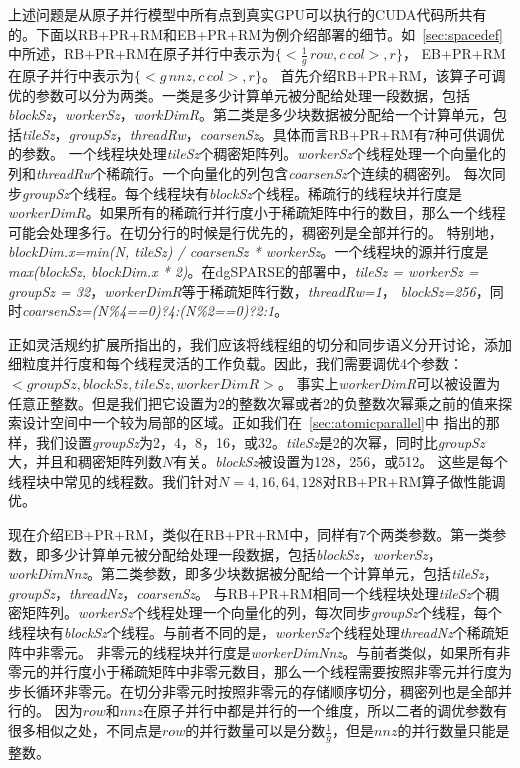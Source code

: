 上述问题是从原子并行模型中所有点到真实GPU可以执行的CUDA代码所共有的。下面以RB+PR+RM和EB+PR+RM为例介绍部署的细节。如~\ref{sec:spacedef}中所述，RB+PR+RM在原子并行中表示为$\{<\frac{1}{g}\,row, c\,col>,r\}$，
EB+PR+RM在原子并行中表示为$\{<g\,nnz , c\,col>,r\}$。
首先介绍RB+PR+RM，该算子可调优的参数可以分为两类。一类是多少计算单元被分配给处理一段数据，包括\textit{blockSz}，\textit{workerSz}，\textit{workDimR}。第二类是多少块数据被分配给一个计算单元，包括\textit{tileSz}，\textit{groupSz}，\textit{threadRw}，\textit{coarsenSz}。具体而言RB+PR+RM有7种可供调优的参数。
一个线程块处理\textit{tileSz}个稠密矩阵列。\textit{workerSz}个线程处理一个向量化的列和\textit{threadRw}个稀疏行。一个向量化的列包含\textit{coarsenSz}个连续的稠密列。
每次同步\textit{groupSz}个线程。每个线程块有\textit{blockSz}个线程。稀疏行的线程块并行度是\textit{workerDimR}。如果所有的稀疏行并行度小于稀疏矩阵中行的数目，那么一个线程可能会处理多行。在切分行的时候是行优先的，稠密列是全部并行的。
特别地，\textit{blockDim.x=min(N, tileSz) / coarsenSz * workerSz}。一个线程块的源并行度是\textit{max(blockSz, blockDim.x * 2)}。在dgSPARSE的部署中，\textit{tileSz = workerSz = groupSz = 32}，\textit{workerDimR}等于稀疏矩阵行数，\textit{threadRw=1}，
\textit{blockSz=256}，同时\textit{coarsenSz=(N\%4==0)?4:(N\%2==0)?2:1}。

正如灵活规约扩展所指出的，我们应该将线程组的切分和同步语义分开讨论，添加细粒度并行度和每个线程灵活的工作负载。因此，我们需要调优4个参数：$<groupSz, blockSz, tileSz, workerDimR>$。
事实上\textit{workerDimR}可以被设置为任意正整数。但是我们把它设置为2的整数次幂或者2的负整数次幂乘之前的值来探索设计空间中一个较为局部的区域。正如我们在~\ref{sec:atomicparallel}中
指出的那样，我们设置\textit{groupSz}为2，4，8，16，或32。\textit{tileSz}是2的次幂，同时比\textit{groupSz}大，并且和稠密矩阵列数$N$有关。\textit{blockSz}被设置为128，256，或512。
这些是每个线程块中常见的线程数。我们针对$N=4,16,64,128$对RB+PR+RM算子做性能调优。

现在介绍EB+PR+RM，类似在RB+PR+RM中，同样有7个两类参数。第一类参数，即多少计算单元被分配给处理一段数据，包括\textit{blockSz}，\textit{workerSz}，\textit{workDimNnz}。第二类参数，即多少块数据被分配给一个计算单元，包括\textit{tileSz}，\textit{groupSz}，\textit{threadNz}，\textit{coarsenSz}。
与RB+PR+RM相同一个线程块处理\textit{tileSz}个稠密矩阵列。\textit{workerSz}个线程处理一个向量化的列，每次同步\textit{groupSz}个线程，每个线程块有\textit{blockSz}个线程。与前者不同的是，\textit{workerSz}个线程处理\textit{threadNz}个稀疏矩阵中非零元。
非零元的线程块并行度是\textit{workerDimNnz}。与前者类似，如果所有非零元的并行度小于稀疏矩阵中非零元数目，那么一个线程需要按照非零元并行度为步长循环非零元。在切分非零元时按照非零元的存储顺序切分，稠密列也是全部并行的。
因为$row$和$nnz$在原子并行中都是并行的一个维度，所以二者的调优参数有很多相似之处，不同点是$row$的并行数量可以是分数$\frac{1}{g}$，但是$nnz$的并行数量只能是整数。

